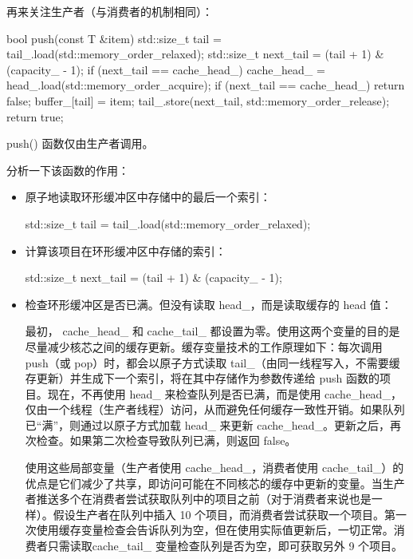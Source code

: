 再来关注生产者（与消费者的机制相同）：

\begin{cpp}
bool push(const T &item) {
    std::size_t tail = tail_.load(std::memory_order_relaxed);
    std::size_t next_tail = (tail + 1) & (capacity_ - 1);
    if (next_tail == cache_head_) {
        cache_head_ = head_.load(std::memory_order_acquire);
        if (next_tail == cache_head_) {
            return false;
        }
    }
    buffer_[tail] = item;
    tail_.store(next_tail, std::memory_order_release);
    return true;
}
\end{cpp}

push() 函数仅由生产者调用。

分析一下该函数的作用：

\begin{itemize}
\item
原子地读取环形缓冲区中存储中的最后一个索引：

\begin{cpp}
std::size_t tail = tail_.load(std::memory_order_relaxed);
\end{cpp}

\item
计算该项目在环形缓冲区中存储的索引：

\begin{cpp}
std::size_t next_tail = (tail + 1) & (capacity_ - 1);
\end{cpp}

\item
检查环形缓冲区是否已满。但没有读取 head\_，而是读取缓存的 head 值：

\begin{cpp}
    if (next_tail == cache_head_) {
\end{cpp}

最初， cache\_head\_ 和 cache\_tail\_ 都设置为零。使用这两个变量的目的是尽量减少核芯之间的缓存更新。缓存变量技术的工作原理如下：每次调用 push（或 pop）时，都会以原子方式读取 tail\_（由同一线程写入，不需要缓存更新）并生成下一个索引，将在其中存储作为参数传递给 push 函数的项目。现在，不再使用 head\_ 来检查队列是否已满，而是使用 cache\_head\_，仅由一个线程（生产者线程）访问，从而避免任何缓存一致性开销。如果队列已“满”，则通过以原子方式加载 head\_ 来更新 cache\_head\_。更新之后，再次检查。如果第二次检查导致队列已满，则返回 false。

使用这些局部变量（生产者使用 cache\_head\_，消费者使用 cache\_tail\_）的优点是它们减少了共享，即访问可能在不同核芯的缓存中更新的变量。当生产者推送多个在消费者尝试获取队列中的项目之前（对于消费者来说也是一样）。假设生产者在队列中插入 10 个项目，而消费者尝试获取一个项目。第一次使用缓存变量检查会告诉队列为空，但在使用实际值更新后，一切正常。消费者只需读取cache\_tail\_ 变量检查队列是否为空，即可获取另外 9 个项目。


\end{itemize}
